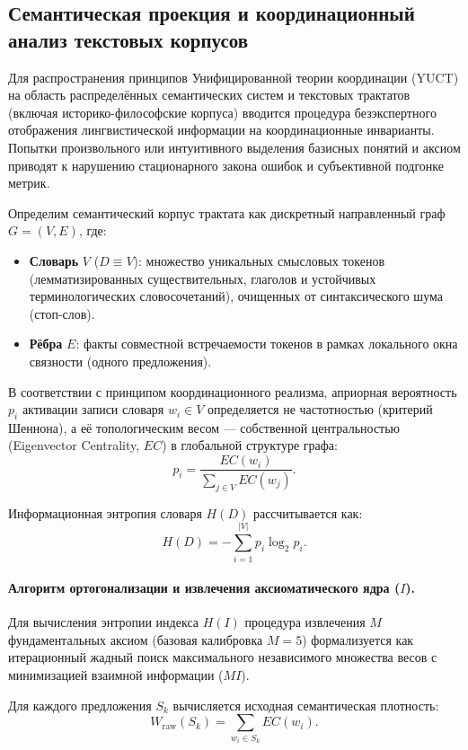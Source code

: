 \documentclass[12pt,a4paper]{article}
\begin{document}
	\subsection{Семантическая проекция и координационный анализ текстовых корпусов}
	\label{subsec:semantic-projection}
	
	Для распространения принципов Унифицированной теории координации (YUCT) на область распределённых семантических систем и текстовых трактатов (включая историко-философские корпуса) вводится процедура безэкспертного отображения лингвистической информации на координационные инварианты. Попытки произвольного или интуитивного выделения базисных понятий и аксиом приводят к нарушению стационарного закона ошибок и субъективной подгонке метрик.
	
	Определим семантический корпус трактата как дискретный направленный граф \(G = (V, E)\), где:
	\begin{itemize}
		\item \textbf{Словарь} \(V\) (\(D \equiv V\)): множество уникальных смысловых токенов (лемматизированных существительных, глаголов и устойчивых терминологических словосочетаний), очищенных от синтаксического шума (стоп-слов).
		\item \textbf{Рёбра} \(E\): факты совместной встречаемости токенов в рамках локального окна связности (одного предложения).
	\end{itemize}
	
	В соответствии с принципом координационного реализма, априорная вероятность \(p_{i}\) активации записи словаря \(w_i \in V\) определяется не частотностью (критерий Шеннона), а её топологическим весом — собственной центральностью (Eigenvector Centrality, \(EC\)) в глобальной структуре графа:
	\[
	p_{i} = \frac{EC(w_{i})}{\sum_{j \in V} EC(w_{j})}.
	\]
	
	Информационная энтропия словаря \(H(D)\) рассчитывается как:
	\[
	H(D) = -\sum_{i=1}^{|V|} p_{i} \log_{2} p_{i}.
	\]
	
	\paragraph{Алгоритм ортогонализации и извлечения аксиоматического ядра (\(I\)).}
	Для вычисления энтропии индекса \(H(I)\) процедура извлечения \(M\) фундаментальных аксиом (базовая калибровка \(M = 5\)) формализуется как итерационный жадный поиск максимального независимого множества весов с минимизацией взаимной информации (\(MI\)).
	
	Для каждого предложения \(S_{k}\) вычисляется исходная семантическая плотность:
	\[
	W_{\text{raw}}(S_k) = \sum_{w_i \in S_k} EC(w_i).
	\]
	
\end{document}
